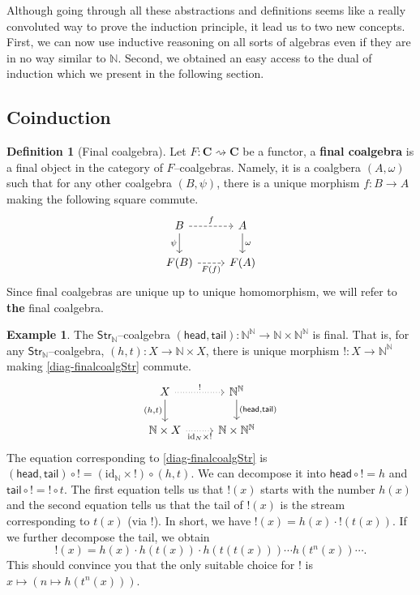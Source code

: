 \documentclass{article}
\theoremstyle{definition}
\newtheorem{defn}[thm]{Definition}
\newtheorem{exmp}[thm]{Example}
\theoremstyle{remark}
\newcommand{\N}{\mathbb{N}}
\newcommand{\id}{\text{id}}
\newcommand{\Str}{\textsf{Str}}
\newcommand{\head}{\textsf{head}}
\newcommand{\tail}{\textsf{tail}}
\begin{document}
Although going through all these abstractions and definitions seems like a really convoluted way to prove the induction principle, it lead us to two new concepts. First, we can now use inductive reasoning on all sorts of algebras even if they are in no way similar to $\N$. Second, we obtained an easy access to the dual of induction which we present in the following section.

\subsection{Coinduction}
\begin{defn}[Final coalgebra]
	Let $F:\mathbf{C}\rightsquigarrow \mathbf{C}$ be a functor, a \textbf{final coalgebra} is a final object in the category of $F$--coalgebras. Namely, it is a coalgbera $(A, \omega)$ such that for any other coalgebra $(B, \psi)$, there is a unique morphism $f: B\rightarrow A$ making the following square commute.
	\begin{equation}\label{diag-initcoalg}
	\centering
	\begin{tikzcd}
	B \arrow[d, "\psi"'] \arrow[r, dashed, "f"] & A \arrow[d, "\omega"] \\
	F(B) \arrow[r, dashed, "F(f)"']                           & F(A)                       
	\end{tikzcd}
    \end{equation}
    Since final coalgebras are unique up to unique homomorphism, we will refer to \textbf{the} final coalgebra.
\end{defn}
\begin{exmp}\label{exmp-finalcoalgStr}
    The $\Str_\N$--coalgebra $(\head,\tail): \N^\N \rightarrow \N \times \N^\N$ is final. That is, for any $\Str_\N$--coalgebra, $(h,t): X \rightarrow \N \times X$, there is unique morphism $!:X \rightarrow \N^\N$ making \eqref{diag-finalcoalgStr} commute.
    \begin{equation}\label{diag-finalcoalgStr}
        \begin{tikzcd}
            X \arrow[d, "{(h,t)}"'] \arrow[r, "!", dotted]  & \N^\N \arrow[d, "{(\head,\tail)}"] \\
            \N\times X \arrow[r, "\id_N \times !"', dotted] & \N \times \N^\N                   
        \end{tikzcd}
    \end{equation}
    The equation corresponding to \eqref{diag-finalcoalgStr} is $(\head, \tail) \circ ! = (\id_\N \times !) \circ (h,t)$. We can decompose it into $\head \circ ! = h$ and $\tail \circ ! = ! \circ t$. The first equation tells us that $!(x)$ starts with the number $h(x)$ and the second equation tells us that the tail of $!(x)$ is the stream corresponding to $t(x)$ (via $!$). In short, we have $!(x) = h(x) \cdot !(t(x))$. If we further decompose the tail, we obtain
    \[!(x) = h(x) \cdot h(t(x)) \cdot h(t(t(x))) \cdots h(t^n(x))\cdots.\]
    This should convince you that the only suitable choice for $!$ is $x \mapsto (n \mapsto h(t^n(x)))$.
\end{exmp}
\end{document}
